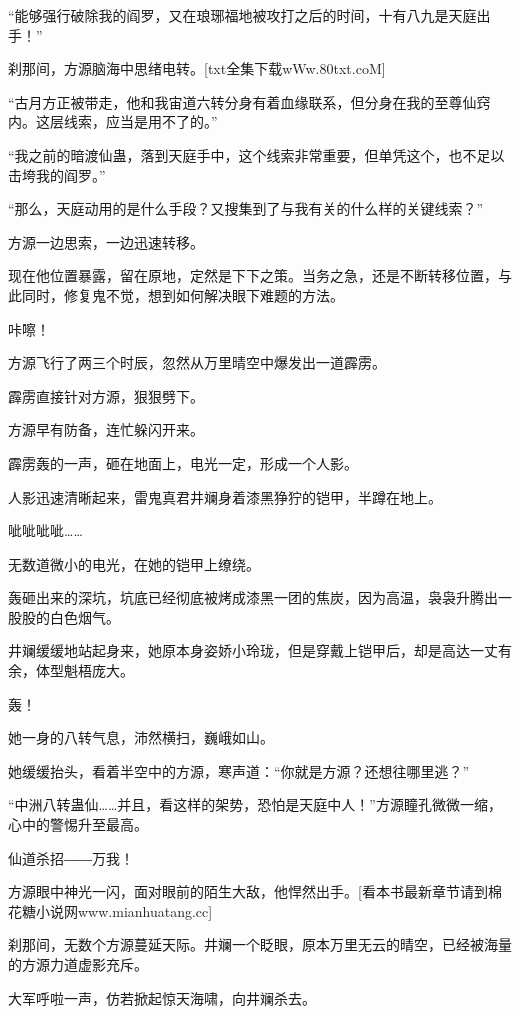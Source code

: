 
\begin{this_body}

“能够强行破除我的阎罗，又在琅琊福地被攻打之后的时间，十有八九是天庭出手！”

刹那间，方源脑海中思绪电转。[txt全集下载wWw.80txt.coM]

“古月方正被带走，他和我宙道六转分身有着血缘联系，但分身在我的至尊仙窍内。这层线索，应当是用不了的。”

“我之前的暗渡仙蛊，落到天庭手中，这个线索非常重要，但单凭这个，也不足以击垮我的阎罗。”

“那么，天庭动用的是什么手段？又搜集到了与我有关的什么样的关键线索？”

方源一边思索，一边迅速转移。

现在他位置暴露，留在原地，定然是下下之策。当务之急，还是不断转移位置，与此同时，修复鬼不觉，想到如何解决眼下难题的方法。

咔嚓！

方源飞行了两三个时辰，忽然从万里晴空中爆发出一道霹雳。

霹雳直接针对方源，狠狠劈下。

方源早有防备，连忙躲闪开来。

霹雳轰的一声，砸在地面上，电光一定，形成一个人影。

人影迅速清晰起来，雷鬼真君井斓身着漆黑狰狞的铠甲，半蹲在地上。

呲呲呲呲……

无数道微小的电光，在她的铠甲上缭绕。

轰砸出来的深坑，坑底已经彻底被烤成漆黑一团的焦炭，因为高温，袅袅升腾出一股股的白色烟气。

井斓缓缓地站起身来，她原本身姿娇小玲珑，但是穿戴上铠甲后，却是高达一丈有余，体型魁梧庞大。

轰！

她一身的八转气息，沛然横扫，巍峨如山。

她缓缓抬头，看着半空中的方源，寒声道：“你就是方源？还想往哪里逃？”

“中洲八转蛊仙……并且，看这样的架势，恐怕是天庭中人！”方源瞳孔微微一缩，心中的警惕升至最高。

仙道杀招――万我！

方源眼中神光一闪，面对眼前的陌生大敌，他悍然出手。[看本书最新章节请到棉花糖小说网www.mianhuatang.cc]

刹那间，无数个方源蔓延天际。井斓一个眨眼，原本万里无云的晴空，已经被海量的方源力道虚影充斥。

大军呼啦一声，仿若掀起惊天海啸，向井斓杀去。


\end{this_body}
